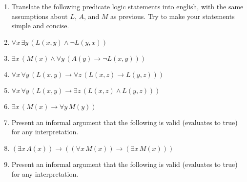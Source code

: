 \documentclass{cs81-homework}
\begin{document}
\begin{enumerate}
  \newpage

\item[] Translate the following predicate logic statements into english, with
  the same assumptions about \(L\), \(A\), and \(M\) as previous. Try to make
  your statements simple and concise.
  
\item {} \(\forall x \, \exists y \, (L(x, y) \land \lnot L(y, x))\)

  \begin{solution*}
  \end{solution*}

\item {}
  \(\exists x \, (M(x) \land \forall y \, (A(y) \to \lnot L(x, y)))\)

  \begin{solution*}
  \end{solution*}

\item {}
  \(\forall x \, \forall y \, (L(x, y) \to \forall z \, (L(x, z) \to L(y, z)))\)

  \begin{solution*}
  \end{solution*}

\item {}
  \(\forall x \, \forall y \, (L(x, y) \to \exists z \, (L(x, z) \land L (y,
  z)))\)

  \begin{solution*}
  \end{solution*}

\item {} \(\exists x \, (M(x) \to \forall y \, M(y))\)

  \begin{solution*}
  \end{solution*}

  \newpage

\item[] Present an informal argument that the following is valid (evaluates to
  true) for any interpretation.
  
\item {}
  \((\exists x \, A(x)) \to ((\forall x \, M(x)) \to (\exists x \, M(x)))\)

  \begin{solution}
  \end{solution}

\item[] Present an informal argument that the following is valid (evaluates to
  true) for any interpretation.


\end{enumerate}
\end{document}
